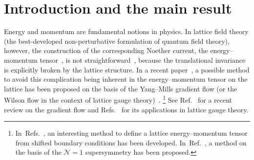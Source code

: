 \section{Introduction and the main result}
\label{sec:1}
Energy and momentum are fundamental notions in physics. In lattice field theory
(the best-developed non-perturbative formulation of quantum field theory),
however, the construction of the corresponding Noether current, the
energy--momentum
tensor~\cite{Callan:1970ze,Coleman:1970je,Freedman:1974gs,Joglekar:1975jm}, is
not straightforward~\cite{Caracciolo:1988hc,Caracciolo:1989pt}, because the
translational invariance is explicitly broken by the lattice structure. In a
recent paper~\cite{Suzuki:2013gza}, a possible method to avoid this
complication being inherent in the energy--momentum tensor on the lattice has
been proposed on the basis of the Yang--Mills gradient flow (or the Wilson flow
in the context of lattice gauge
theory)~\cite{Luscher:2010iy,Luscher:2011bx,Luscher:2013cpa}.%
\footnote{In~Refs.~\cite{Giusti:2010bb,Giusti:2012yj,Robaina:2013zmb,%
Giusti:2013sqa,Giusti:2013mxa,Giusti:2014ila}, an interesting method to define
a lattice energy--momentum tensor from shifted boundary conditions has been
developed. In~Ref.~\cite{Suzuki:2012wx}, a method on the basis of the
$\mathcal{N}=1$ supersymmetry has been proposed.} See
Ref.~\cite{Luscher:2013vga} for a recent review on the gradient flow and
Refs.~\cite{Borsanyi:2012zs,Borsanyi:2012zr,Fodor:2012td,Fritzsch:2013je,%
Monahan:2013lwa,Shindler:2013bia,Bonati:2014tqa} for its applications in
lattice gauge theory.


